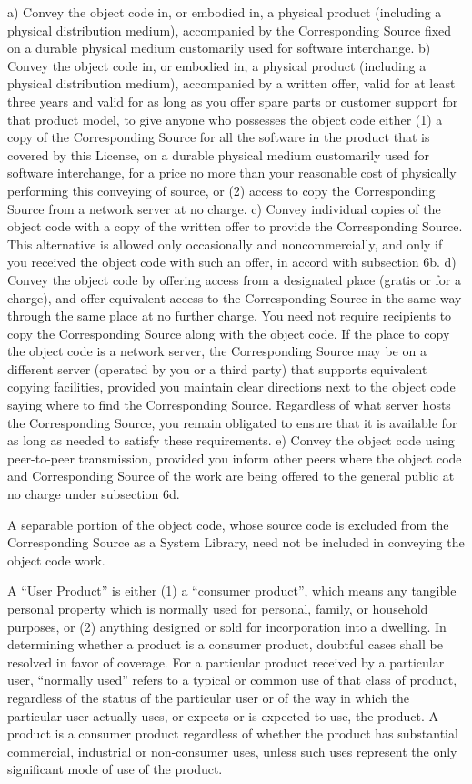    a) Convey the object code in, or embodied in, a physical product (including a physical distribution medium), accompanied by the Corresponding Source fixed on a durable physical medium customarily used for software interchange.
    b) Convey the object code in, or embodied in, a physical product (including a physical distribution medium), accompanied by a written offer, valid for at least three years and valid for as long as you offer spare parts or customer support for that product model, to give anyone who possesses the object code either (1) a copy of the Corresponding Source for all the software in the product that is covered by this License, on a durable physical medium customarily used for software interchange, for a price no more than your reasonable cost of physically performing this conveying of source, or (2) access to copy the Corresponding Source from a network server at no charge.
    c) Convey individual copies of the object code with a copy of the written offer to provide the Corresponding Source. This alternative is allowed only occasionally and noncommercially, and only if you received the object code with such an offer, in accord with subsection 6b.
    d) Convey the object code by offering access from a designated place (gratis or for a charge), and offer equivalent access to the Corresponding Source in the same way through the same place at no further charge. You need not require recipients to copy the Corresponding Source along with the object code. If the place to copy the object code is a network server, the Corresponding Source may be on a different server (operated by you or a third party) that supports equivalent copying facilities, provided you maintain clear directions next to the object code saying where to find the Corresponding Source. Regardless of what server hosts the Corresponding Source, you remain obligated to ensure that it is available for as long as needed to satisfy these requirements.
    e) Convey the object code using peer-to-peer transmission, provided you inform other peers where the object code and Corresponding Source of the work are being offered to the general public at no charge under subsection 6d.

A separable portion of the object code, whose source code is excluded from the Corresponding Source as a System Library, need not be included in conveying the object code work.

A “User Product” is either (1) a “consumer product”, which means any tangible personal property which is normally used for personal, family, or household purposes, or (2) anything designed or sold for incorporation into a dwelling. In determining whether a product is a consumer product, doubtful cases shall be resolved in favor of coverage. For a particular product received by a particular user, “normally used” refers to a typical or common use of that class of product, regardless of the status of the particular user or of the way in which the particular user actually uses, or expects or is expected to use, the product. A product is a consumer product regardless of whether the product has substantial commercial, industrial or non-consumer uses, unless such uses represent the only significant mode of use of the product.

